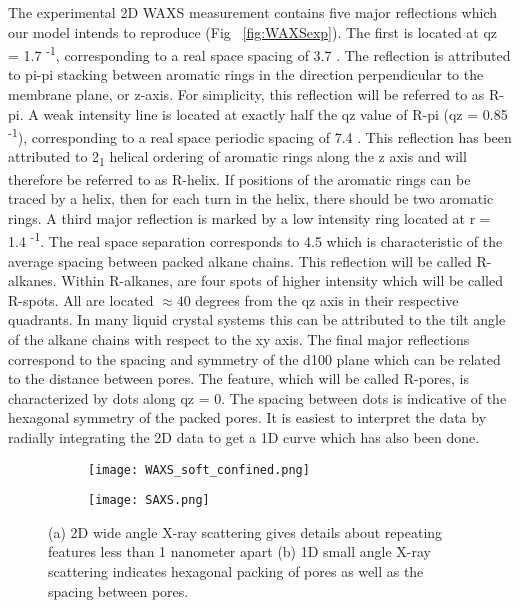 The experimental 2D WAXS measurement contains five major reflections which
our model intends to reproduce (Fig ~\ref{fig:WAXSexp}). The first is located
at qz = 1.7 \angstrom \textsuperscript{-1}, corresponding to a real space 
spacing of 3.7 \angstrom. The reflection is attributed to pi-pi stacking
between aromatic rings in the direction perpendicular to the membrane plane, or z-axis. 
For simplicity, this reflection will be referred to as R-pi. A weak intensity
line is located at exactly half the qz value of R-pi (qz = 0.85 \angstrom \textsuperscript{-1}), corresponding to a 
real space periodic spacing of 7.4 \angstrom. This reflection has been 
attributed to 2\textsubscript{1} helical ordering of aromatic rings along the
z axis and will therefore be referred to as R-helix. If positions of the 
aromatic rings can be traced by a helix, then for each turn in the helix, 
there should be two aromatic rings. A third major reflection is marked by 
a low intensity ring located at r = 1.4 \angstrom \textsuperscript{-1}. The
real space separation corresponds to 4.5 \angstrom which is characteristic
of the average spacing between packed alkane chains. This reflection will be
called R-alkanes. Within R-alkanes, are four spots of higher intensity which 
will be called R-spots. All are located $\approx 40$ degrees from the qz axis
in their respective quadrants. In many liquid crystal systems this can be
attributed to the tilt angle of the alkane chains with respect to the xy axis. 
The final major reflections correspond to the spacing and symmetry of the d100 
plane which can be related to the distance between pores. The feature, which 
will be called R-pores, is characterized by dots along qz = 0. The spacing
between dots is indicative of the hexagonal symmetry of the packed pores. It
is easiest to interpret the data by radially integrating the 2D data to get 
a 1D curve which has also been done.

\begin{figure}
	\centering
	\begin{subfigure}{0.47\linewidth}
		\centering
		\texttt{[image: WAXS\_soft\_confined.png]}
		\caption{}\label{fig:WAXS}
	\end{subfigure}
	\begin{subfigure}{0.43\linewidth}
		\centering
		\vspace{12mm}
		\texttt{[image: SAXS.png]}
		\caption{}\label{figs:SAXS}
	\end{subfigure}
	\caption{(a) 2D wide angle X-ray scattering gives details about repeating features less than 1 nanometer apart (b) 1D small angle X-ray scattering indicates hexagonal packing of pores as well as the spacing between pores.}\label{fig:SWAXS}
\end{figure}

